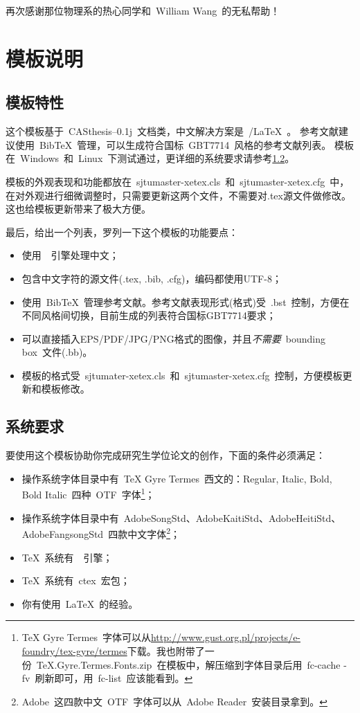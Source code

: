 再次感谢那位物理系的热心同学和~William Wang~的无私帮助！

\section{模板说明}
\label{sec:fastguide}

\subsection{模板特性}
\label{sec:features}

这个模板基于~CASthesis--0.1j~文档类，中文解决方案是~\XeTeX/\LaTeX~。
参考文献建议使用~BibTeX~管理，可以生成符合国标~GBT7714~风格的参考文献列表。
模板在~Windows~和~Linux~下测试通过，更详细的系统要求请参考\ref{sec:requirements}。

模板的外观表现和功能都放在~sjtumaster-xetex.cls~和~sjtumaster-xetex.cfg~中，在对外观进行细微调整时，只需要更新这两个文件，不需要对.tex源文件做修改。
这也给模板更新带来了极大方便。

最后，给出一个列表，罗列一下这个模板的功能要点：

\begin{itemize}
\item 使用~\XeTeX~引擎处理中文；
\item 包含中文字符的源文件(.tex, .bib, .cfg)，编码都使用UTF-8；
\item 使用~BibTeX~管理参考文献。参考文献表现形式(格式)受~.bst~控制，方便在不同风格间切换，目前生成的列表符合国标GBT7714要求；
\item 可以直接插入EPS/PDF/JPG/PNG格式的图像，并且\emph{不需要}~bounding box~文件(.bb)。
\item 模板的格式受~sjtumater-xetex.cls~和~sjtumaster-xetex.cfg~控制，方便模板更新和模板修改。
\end{itemize}

\subsection{系统要求}
\label{sec:requirements}

要使用这个模板协助你完成研究生学位论文的创作，下面的条件必须满足：

\begin{itemize}
\item 操作系统字体目录中有~TeX Gyre Termes~西文的：Regular, Italic, Bold, Bold Italic~四种~OTF~字体\footnote{TeX Gyre Termes~字体可以从\href{http://www.gust.org.pl/projects/e-foundry/tex-gyre/termes}{http://www.gust.org.pl/projects/e-foundry/tex-gyre/termes}下载。我也附带了一份~TeX.Gyre.Termes.Fonts.zip~在模板中，解压缩到字体目录后用~fc-cache -fv~刷新即可，用~fc-list~应该能看到。}；
\item 操作系统字体目录中有~AdobeSongStd、AdobeKaitiStd、AdobeHeitiStd、AdobeFangsongStd~四款中文字体\footnote{Adobe~这四款中文~OTF~字体可以从~Adobe Reader~安装目录拿到。}；
\item \TeX~系统有~\XeTeX~引擎；
\item \TeX~系统有~ctex~宏包；
\item 你有使用~\LaTeX~的经验。
\end{itemize}

